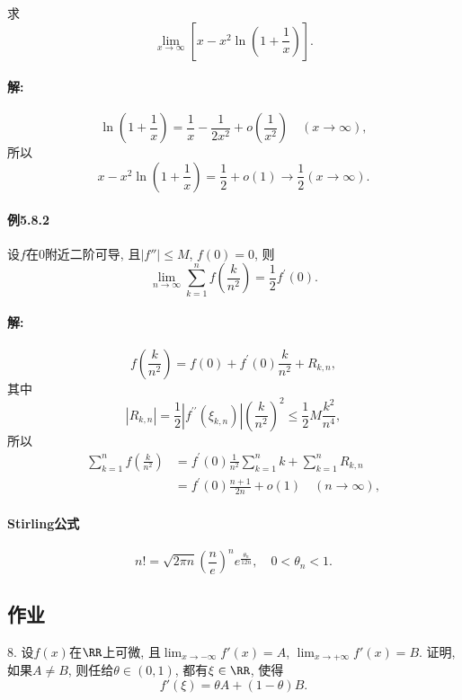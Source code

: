 求
\[
\lim_{x\rightarrow\infty}\left[x-x^{2}\ln\left(1+\frac{1}{x}\right)\right].
\]


\paragraph{解:}

\[
\ln\left(1+\frac{1}{x}\right)=\frac{1}{x}-\frac{1}{2x^{2}}+o\left(\frac{1}{x^{2}}\right)\quad(x\rightarrow\infty),
\]
所以
\[
x-x^{2}\ln\left(1+\frac{1}{x}\right)=\frac{1}{2}+o(1)\rightarrow\frac{1}{2}(x\rightarrow\infty).
\]


\paragraph{例5.8.2}

设$f$在$0$附近二阶可导, 且$\left|f''\right|\le M$, $f(0)=0$, 则
\[
\lim_{n\rightarrow\infty}\sum_{k=1}^{n}f\left(\frac{k}{n^{2}}\right)=\frac{1}{2}f^{\prime}(0).
\]


\paragraph{解:}

\[
f\left(\frac{k}{n^{2}}\right)=f(0)+f^{\prime}(0)\frac{k}{n^{2}}+R_{k,n},
\]
其中
\[
\left|R_{k,n}\right|=\frac{1}{2}\left|f^{\prime\prime}\left(\xi_{k,n}\right)\right|\left(\frac{k}{n^{2}}\right)^{2}\leqslant\frac{1}{2}M\frac{k^{2}}{n^{4}},
\]
所以
\[
\begin{aligned}\sum_{k=1}^{n}f\left(\frac{k}{n^{2}}\right) & =f^{\prime}(0)\frac{1}{n^{2}}\sum_{k=1}^{n}k+\sum_{k=1}^{n}R_{k,n}\\
	& =f^{\prime}(0)\frac{n+1}{2n}+o(1)\quad(n\rightarrow\infty),
\end{aligned}
\]


\paragraph{Stirling公式}

\[
n!=\sqrt{2\pi n}\left(\frac{n}{e}\right)^{n}e^{\frac{\theta_{n}}{12n}},\quad0<\theta_{n}<1.
\]


\subsection{作业}

8. 设$f(x)$在$\RR$上可微, 且$\lim_{x\to-\infty}f'(x)=A$, $\lim_{x\to+\infty}f'(x)=B$.
证明, 如果$A\ne B$, 则任给$\theta\in(0,1)$, 都有$\xi\in\RR$, 使得
\[
f'(\xi)=\theta A+(1-\theta)B.
\]

